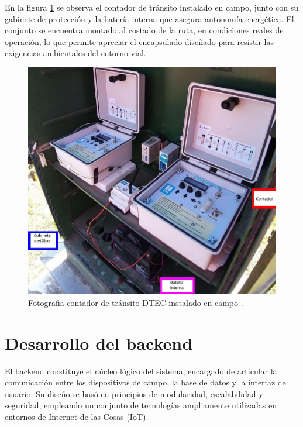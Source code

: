 \begin{itemize}
\begin{itemize}
En la figura \ref{fig:foto_gabinete} se observa el contador de tránsito instalado en campo, junto con su gabinete de protección y la batería interna que asegura autonomía energética. El conjunto se encuentra montado al costado de la ruta, en condiciones reales de operación, lo que permite apreciar el encapsulado diseñado para resistir las exigencias ambientales del entorno vial.


\begin{figure}[H]
  \centering
  \includegraphics[width=1\linewidth]{./Figures/fotoGabinete.jpeg}
  \caption{Fotografia contador de tránsito DTEC instalado en campo \protect\footnotemark.}
  \label{fig:foto_gabinete}
\end{figure}

\end{itemize}

\end{itemize}

\section{Desarrollo del backend}

El backend constituye el núcleo lógico del sistema, encargado de articular la comunicación entre los dispositivos de campo, la base de datos y la interfaz de usuario. Su diseño se basó en principios de modularidad, escalabilidad y seguridad, empleando un conjunto de tecnologías ampliamente utilizadas en entornos de Internet de las Cosas (IoT).


